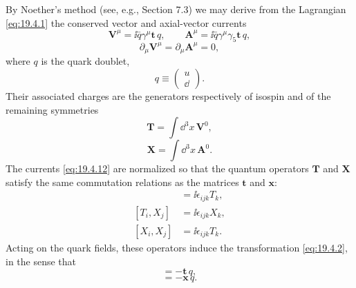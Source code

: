 By Noether's method (see, e.g., Section 7.3) we may derive from the Lagrangian \eqref{eq:19.4.1} the conserved vector and axial-vector currents
\begin{equation}
\mathbf{V}^\mu=\ii\bar q\gamma^\mu\mathbf{t}\,q,
\qquad
\mathbf{A}^\mu=\ii\bar q\gamma^\mu\gamma_5\mathbf{t}\,q,
\tag{19.4.12}\label{eq:19.4.12}
\end{equation}
\begin{equation}
\partial_\mu\mathbf{V}^\mu=\partial_\mu\mathbf{A}^\mu=0,
\tag{19.4.13}\label{eq:19.4.13}
\end{equation}
where $q$ is the quark doublet,
\begin{equation}
q\equiv\begin{pmatrix}u\\\dd\end{pmatrix}.
\tag{19.4.14}\label{eq:19.4.14}
\end{equation}
Their associated charges are the generators respectively of isospin and of the remaining symmetries
\begin{equation}
\mathbf{T}=\int \dd^3x\,\mathbf{V}^0,
\tag{19.4.15}\label{eq:19.4.15}
\end{equation}
\begin{equation}
\mathbf{X}=\int \dd^3x\,\mathbf{A}^0.
\tag{19.4.16}\label{eq:19.4.16}
\end{equation}
The currents \eqref{eq:19.4.12} are normalized so that the quantum operators $\mathbf{T}$ and $\mathbf{X}$ satisfy the same commutation relations as the matrices $\mathbf{t}$ and $\mathbf{x}$:
\begin{align}
[T_i,T_j]&=\ii\epsilon_{ijk}T_k,
\tag{19.4.17}\label{eq:19.4.17}\\
[T_i,X_j]&=\ii\epsilon_{ijk}X_k,
\tag{19.4.18}\label{eq:19.4.18}\\
[X_i,X_j]&=\ii\epsilon_{ijk}T_k.
\tag{19.4.19}\label{eq:19.4.19}
\end{align}
Acting on the quark fields, these operators induce the transformation \eqref{eq:19.4.2}, in the sense that
\begin{equation}
[\mathbf{T},q]=-\mathbf{t}\,q,
\tag{19.4.20}\label{eq:19.4.20}
\end{equation}
\begin{equation}
[\mathbf{X},q]=-\mathbf{x}\,q.
\tag{19.4.21}\label{eq:19.4.21}
\end{equation}

